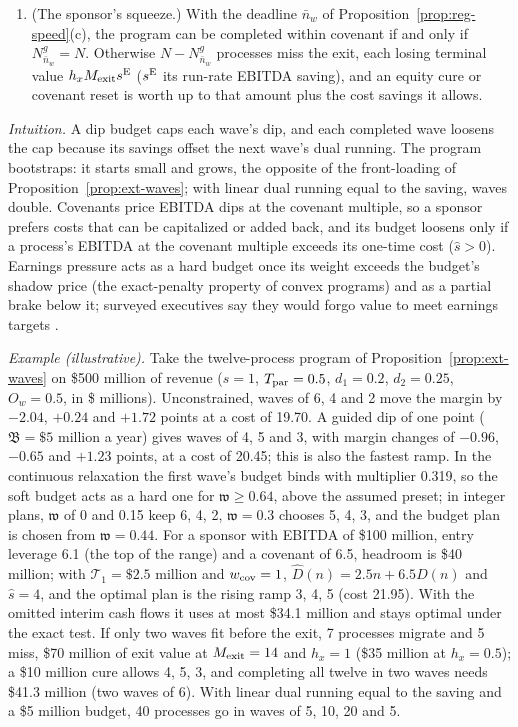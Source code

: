 \begin{proposition}
\begin{enumerate}
\item[(d)] (The sponsor's squeeze.) With the deadline $\bar n_w$ of Proposition~\ref{prop:reg-speed}(c), the program can be completed within covenant if and only if $N^g_{\bar n_w}=N$. Otherwise $N-N^g_{\bar n_w}$ processes miss the exit, each losing terminal value $h_xM_{\rm exit}s^{\rm E}$ ($s^{\rm E}$ its run-rate EBITDA saving), and an equity cure or covenant reset is worth up to that amount plus the cost savings it allows.
\end{enumerate}
\end{proposition}

\noindent\emph{Intuition.} A dip budget caps each wave's dip, and each completed wave loosens the cap because its savings offset the next wave's dual running. The program bootstraps: it starts small and grows, the opposite of the front-loading of Proposition~\ref{prop:ext-waves}; with linear dual running equal to the saving, waves double. Covenants price EBITDA dips at the covenant multiple, so a sponsor prefers costs that can be capitalized or added back, and its budget loosens only if a process's EBITDA at the covenant multiple exceeds its one-time cost ($\hat s>0$). Earnings pressure acts as a hard budget once its weight exceeds the budget's shadow price (the exact-penalty property of convex programs) and as a partial brake below it; surveyed executives say they would forgo value to meet earnings targets \citep{graham2005economic}.

\noindent\emph{Example (illustrative).} Take the twelve-process program of Proposition~\ref{prop:ext-waves} on \$500 million of revenue ($s=1$, $T_{\rm par}=0.5$, $d_1=0.2$, $d_2=0.25$, $O_w=0.5$, in \$ millions). Unconstrained, waves of 6, 4 and 2 move the margin by $-2.04$, $+0.24$ and $+1.72$ points at a cost of 19.70. A guided dip of one point ($\mathfrak B=\$5$ million a year) gives waves of 4, 5 and 3, with margin changes of $-0.96$, $-0.65$ and $+1.23$ points, at a cost of 20.45; this is also the fastest ramp. In the continuous relaxation the first wave's budget binds with multiplier 0.319, so the soft budget acts as a hard one for $\mathfrak w\ge0.64$, above the assumed preset; in integer plans, $\mathfrak w$ of 0 and 0.15 keep 6, 4, 2, $\mathfrak w=0.3$ chooses 5, 4, 3, and the budget plan is chosen from $\mathfrak w=0.44$. For a sponsor with EBITDA of \$100 million, entry leverage 6.1 (the top of the range) and a covenant of 6.5, headroom is \$40 million; with $\mathcal T_1=\$2.5$ million and $w_{\rm cov}=1$, $\widehat D(n)=2.5n+6.5D(n)$ and $\hat s=4$, and the optimal plan is the rising ramp 3, 4, 5 (cost 21.95). With the omitted interim cash flows it uses at most \$34.1 million and stays optimal under the exact test. If only two waves fit before the exit, 7 processes migrate and 5 miss, \$70 million of exit value at $M_{\rm exit}=14$ and $h_x=1$ (\$35 million at $h_x=0.5$); a \$10 million cure allows 4, 5, 3, and completing all twelve in two waves needs \$41.3 million (two waves of 6). With linear dual running equal to the saving and a \$5 million budget, 40 processes go in waves of 5, 10, 20 and 5.

